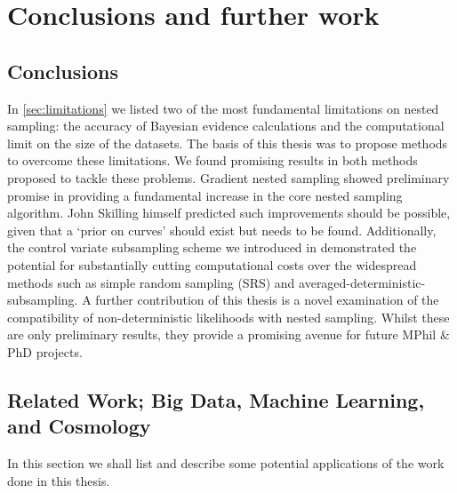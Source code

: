 \chapter{Conclusions and further work}\label{ch:chapter5}

\ifpdf
    \graphicspath{{Chapter5/Figs/Raster/}{Chapter5/Figs/PDF/}{Chapter5/Figs/}}
\else
    \graphicspath{{Chapter5/Figs/Vector/}{Chapter5/Figs/}}
\fi

\section{Conclusions}

In \cref{sec:limitations} we listed two of the most fundamental limitations on nested sampling: the accuracy of Bayesian evidence calculations and the computational limit on the size of the datasets. The basis of this thesis was to propose methods to overcome these limitations. We found promising results in both methods proposed to tackle these problems. Gradient nested sampling showed preliminary promise in providing a fundamental increase in the core nested sampling algorithm. John Skilling himself predicted such improvements should be possible, given that a `prior on curves' should exist but needs to be found. Additionally, the control variate subsampling scheme we introduced in  demonstrated the potential for substantially cutting computational costs over the widespread methods such as simple random sampling (SRS) and averaged-deterministic-subsampling. A further contribution of this thesis is a novel examination of the compatibility of non-deterministic likelihoods with nested sampling. Whilst these are only preliminary results, they provide a promising avenue for future MPhil \& PhD projects. 

\section{Related Work; Big Data, Machine Learning, and Cosmology}

In this section we shall list and describe some potential applications of the work done in this thesis.

